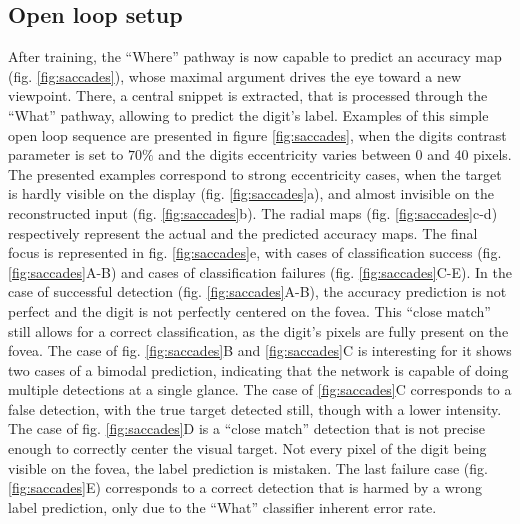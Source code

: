 \subsection*{Open loop setup}
After training, the ``Where'' pathway is now capable to predict an accuracy map (fig. \ref{fig:saccades}), whose maximal argument drives the eye toward a new viewpoint. There, a central snippet is extracted, that is processed through the ``What'' pathway, allowing to predict the digit's label. Examples of this simple open loop sequence are presented in figure \ref{fig:saccades}, when the digits contrast parameter is set to $70\%$ and the digits eccentricity varies between $0$ and $40$ pixels. The presented examples correspond to strong eccentricity cases, when the target is hardly visible on the display (fig. \ref{fig:saccades}a), and almost invisible on the reconstructed input (fig. \ref{fig:saccades}b). The radial maps (fig. \ref{fig:saccades}c-d) respectively represent the actual and the predicted accuracy maps. The final focus is represented in fig. \ref{fig:saccades}e, with cases of classification success (fig. \ref{fig:saccades}A-B) and cases of classification failures (fig. \ref{fig:saccades}C-E).
In the case of successful detection (fig. \ref{fig:saccades}A-B), the accuracy prediction is not perfect and the digit is not perfectly centered on the fovea. This ``close match'' still allows for a correct classification, as the digit's pixels are fully present on the fovea. The case of fig. \ref{fig:saccades}B and \ref{fig:saccades}C
 is interesting for it shows two cases of a bimodal prediction, indicating that the network is capable of doing multiple detections at a single glance. The case of \ref{fig:saccades}C corresponds to a false detection, with the true target detected still, though with a lower intensity. The case of fig. \ref{fig:saccades}D is a ``close match'' detection that is not precise enough to correctly center the visual target. Not every pixel of the digit being visible on the fovea, the label prediction is mistaken.
The last failure case (fig. \ref{fig:saccades}E) corresponds to a correct detection that is harmed by a wrong label prediction, only due to the ``What'' classifier inherent error rate.


